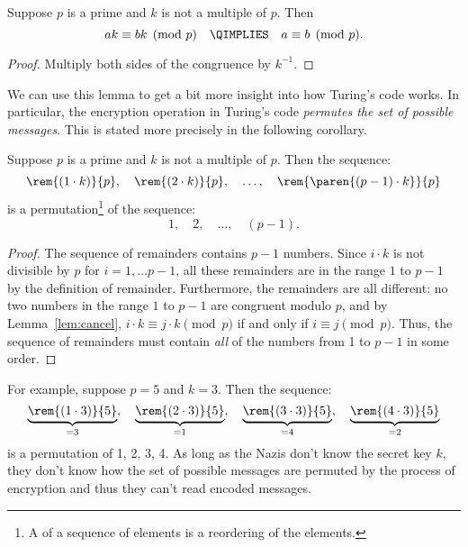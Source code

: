 \begin{lemma}
\label{lem:cancel}
Suppose $p$ is a prime and $k$ is not a multiple of $p$.  Then
%
\[
ak \equiv bk \pmod{p}\quad \QIMPLIES\quad a \equiv b \pmod{p}.
\]
\end{lemma}

\begin{proof}
Multiply both sides of the congruence by $k^{-1}$.
\end{proof}

We can use this lemma to get a bit more insight into how Turing's code
works.  In particular, the encryption operation in Turing's code
\emph{permutes the set of possible messages}.  This is stated more
precisely in the following corollary.

\begin{corollary}
\label{cor:prime-permutes}
Suppose $p$ is a prime and $k$ is not a multiple of $p$.  Then the
sequence:
\[
\rem{(1 \cdot k)}{p},\quad
\rem{(2 \cdot k)}{p},\quad
 \dots,\quad
\rem{\paren{(p-1) \cdot k}}{p}
\]
is a permutation\footnote{A  of a sequence of elements
is a reordering of the elements.} of the sequence:
\[
1,\quad 2,\quad \dots,\quad (p - 1).
\]
\end{corollary}

\begin{proof}
The sequence of remainders contains $p-1$ numbers.  Since $i \cdot k$
is not divisible by $p$ for $i=1,\dots p-1$, all these remainders are
in the range $1$ to $p - 1$ by the definition of remainder.
Furthermore, the remainders are all different: no two numbers in the
range $1$ to $p - 1$ are congruent modulo $p$, and by
Lemma~\ref{lem:cancel}, $i \cdot k \equiv j \cdot k \pmod{p}$ if and
only if $i \equiv j \pmod{p}$.  Thus, the sequence of remainders must
contain \emph{all} of the numbers from 1 to $p - 1$ in some order.
\end{proof}

For example, suppose $p = 5$ and $k = 3$.  Then the sequence:
%
\[
\underbrace{\rem{(1 \cdot 3)}{5}}_{=3},\quad
\underbrace{\rem{(2 \cdot 3)}{5}}_{=1},\quad
\underbrace{\rem{(3 \cdot 3)}{5}}_{=4},\quad
\underbrace{\rem{(4 \cdot 3)}{5}}_{=2}
\]
%
is a permutation of
1, 2, 3, 4.  As long as the Nazis don't know the secret key
$k$, they don't know how the set of possible messages are permuted by the
process of encryption and thus they can't read encoded messages.


